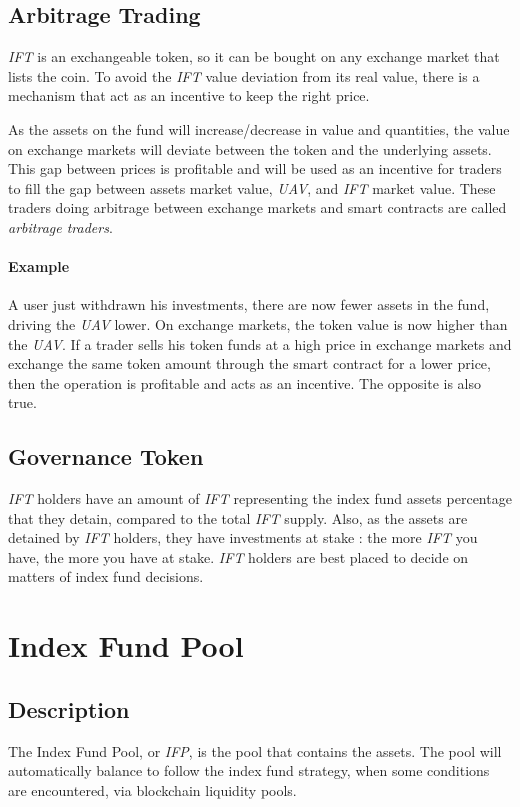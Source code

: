 \documentclass[11pt]{scrartcl}
\begin{document}
    \subsection{Arbitrage Trading}
    \textit{IFT} is an exchangeable token, so it can be bought on any exchange 
    market that lists the coin. To avoid the \textit{IFT} value deviation from 
    its real value, there is a mechanism that act as an incentive to keep the 
    right price.

    As the assets on the fund will increase/decrease in value and quantities, the 
    value on exchange markets will deviate between the token and the underlying assets.
    This gap between prices is profitable and will be used as an incentive for
    traders to fill the gap between assets market value, \textit{UAV}, and \textit{IFT}
    market value. These traders doing arbitrage between exchange markets and smart contracts
    are called \textit{arbitrage traders}.

    \paragraph{Example}
    A user just withdrawn his investments, there are now fewer assets in the fund,
    driving the \textit{UAV} lower. On exchange markets, the token value is now higher
    than the \textit{UAV}. If a trader sells his token funds at a high price in
    exchange markets and exchange the same token amount through the smart contract for a
    lower price, then the operation is profitable and acts as an incentive. 
    The opposite is also true.

    \subsection{Governance Token}
    \textit{IFT} holders have an amount of \textit{IFT} representing the
    index fund assets percentage that they detain, compared to the
    total \textit{IFT} supply. Also, as the assets are detained by \textit{IFT} holders,
    they have investments at stake : the more \textit{IFT} you have, the more
    you have at stake. \textit{IFT} holders are best placed to decide on matters of
    index fund decisions.
    
    \section{Index Fund Pool}

    \subsection{Description}
    The Index Fund Pool, or \textit{IFP}, is the pool that contains the assets.
    The pool will automatically balance to follow the index fund strategy, when 
    some conditions are encountered, via blockchain liquidity pools.
\end{document}
